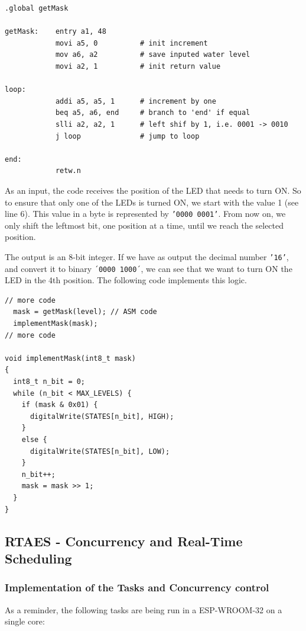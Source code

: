 \documentclass[11pt]{article}
\begin{document}
\begin{verbatim}
.global getMask

getMask:    entry a1, 48
            movi a5, 0          # init increment
            mov a6, a2          # save inputed water level
            movi a2, 1          # init return value

loop: 
            addi a5, a5, 1      # increment by one
            beq a5, a6, end     # branch to 'end' if equal
            slli a2, a2, 1      # left shif by 1, i.e. 0001 -> 0010
            j loop              # jump to loop 

end:
            retw.n
\end{verbatim}

As an input, the code receives the position of the LED that needs to turn ON. So to ensure that only one of the LEDs is turned ON, we start with the value 1 (see line 6). This value in a byte is represented by \texttt{'0000 0001'}. From now on, we only shift the leftmost bit, one position at a time, until we reach the selected position.

The output is an 8-bit integer. If we have as output the decimal number \texttt{'16'}, and convert it to binary \texttt{´0000 1000´}, we can see that we want to turn ON the LED in the 4th position. The following code implements this logic. 

\begin{verbatim}
// more code
  mask = getMask(level); // ASM code
  implementMask(mask);
// more code

void implementMask(int8_t mask)
{
  int8_t n_bit = 0;
  while (n_bit < MAX_LEVELS) {
    if (mask & 0x01) {
      digitalWrite(STATES[n_bit], HIGH);
    }
    else {
      digitalWrite(STATES[n_bit], LOW);
    }
    n_bit++;
    mask = mask >> 1;
  }
}
\end{verbatim}


\subsection{RTAES - Concurrency and Real-Time Scheduling}

\subsubsection{Implementation of the Tasks and Concurrency control}

As a reminder, the following tasks are being run in a ESP-WROOM-32 on a single core:
\end{document}
